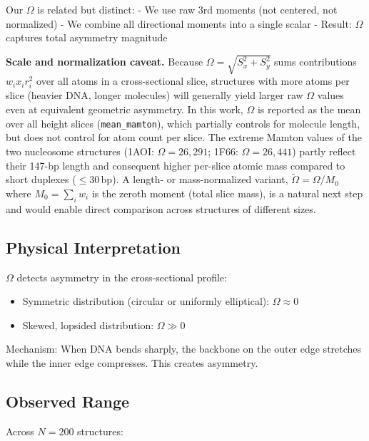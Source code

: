 Our $\Omega$ is related but distinct:
- We use raw 3rd moments (not centered, not normalized)
- We combine all directional moments into a single scalar
- Result: $\Omega$ captures total asymmetry magnitude

\textbf{Scale and normalization caveat.} Because $\Omega = \sqrt{S_x^2 + S_y^2}$ sums contributions $w_i x_i r_i^2$ over all atoms in a cross-sectional slice, structures with more atoms per slice (heavier DNA, longer molecules) will generally yield larger raw $\Omega$ values even at equivalent geometric asymmetry. In this work, $\Omega$ is reported as the mean over all height slices (\texttt{mean\_mamton}), which partially controls for molecule length, but does not control for atom count per slice. The extreme Mamton values of the two nucleosome structures (1AOI: $\Omega = 26{,}291$; 1F66: $\Omega = 26{,}441$) partly reflect their 147-bp length and consequent higher per-slice atomic mass compared to short duplexes ($\leq 30$\,bp). A length- or mass-normalized variant, $\tilde{\Omega} = \Omega / M_0$ where $M_0 = \sum_i w_i$ is the zeroth moment (total slice mass), is a natural next step and would enable direct comparison across structures of different sizes.

\subsection{Physical Interpretation}

$\Omega$ detects asymmetry in the cross-sectional profile:
\begin{itemize}
    \item Symmetric distribution (circular or uniformly elliptical): $\Omega \approx 0$
    \item Skewed, lopsided distribution: $\Omega \gg 0$
\end{itemize}

Mechanism: When DNA bends sharply, the backbone on the outer edge stretches while the inner edge compresses. This creates asymmetry.

\subsection{Observed Range}

Across $N = 200$ structures:

